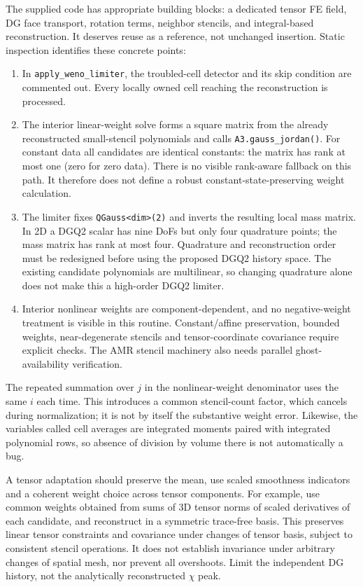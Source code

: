 \documentclass[10pt,letterpaper]{article}
\begin{document}
The supplied code has appropriate building blocks: a dedicated tensor FE field, DG face transport, rotation terms, neighbor stencils, and integral-based reconstruction. It deserves reuse as a reference, not unchanged insertion. Static inspection identifies these concrete points:
\begin{enumerate}
\item In \texttt{apply\_weno\_limiter}, the troubled-cell detector and its skip condition are commented out. Every locally owned cell reaching the reconstruction is processed.
\item The interior linear-weight solve forms a square matrix from the already reconstructed small-stencil polynomials and calls \texttt{A3.gauss\_jordan()}. For constant data all candidates are identical constants: the matrix has rank at most one (zero for zero data). There is no visible rank-aware fallback on this path. It therefore does not define a robust constant-state-preserving weight calculation.
\item The limiter fixes \texttt{QGauss<dim>(2)} and inverts the resulting local mass matrix. In 2D a DGQ2 scalar has nine DoFs but only four quadrature points; the mass matrix has rank at most four. Quadrature and reconstruction order must be redesigned before using the proposed DGQ2 history space. The existing candidate polynomials are multilinear, so changing quadrature alone does not make this a high-order DGQ2 limiter.
\item Interior nonlinear weights are component-dependent, and no negative-weight treatment is visible in this routine. Constant/affine preservation, bounded weights, near-degenerate stencils and tensor-coordinate covariance require explicit checks. The AMR stencil machinery also needs parallel ghost-availability verification.
\end{enumerate}
The repeated summation over $j$ in the nonlinear-weight denominator uses the same $i$ each time. This introduces a common stencil-count factor, which cancels during normalization; it is not by itself the substantive weight error. Likewise, the variables called cell averages are integrated moments paired with integrated polynomial rows, so absence of division by volume there is not automatically a bug.

A tensor adaptation should preserve the mean, use scaled smoothness indicators and a coherent weight choice across tensor components. For example, use common weights obtained from sums of 3D tensor norms of scaled derivatives of each candidate, and reconstruct in a symmetric trace-free basis. This preserves linear tensor constraints and covariance under changes of tensor basis, subject to consistent stencil operations. It does not establish invariance under arbitrary changes of spatial mesh, nor prevent all overshoots. Limit the independent DG history, not the analytically reconstructed $\chi$ peak.
\end{document}
